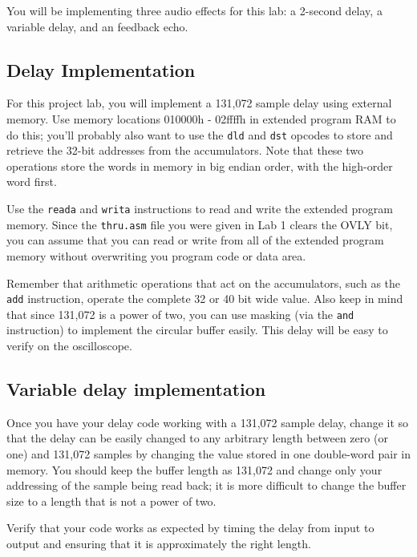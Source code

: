 
%
%
%
%
%

You will be implementing three audio effects for this lab: a 2-second delay,
a variable delay, and an feedback echo.

\subsection{Delay Implementation}

For this project lab, you will implement a 131,072 sample
delay using external memory. Use memory locations 010000h - 02ffffh in
extended program RAM to do this; you'll probably also want to use the
\verb+dld+ and \verb+dst+ opcodes to store and retrieve the 32-bit
addresses from the accumulators. Note that these two operations store
the words in memory in big endian order, with the high-order word first.

Use the \verb+reada+ and \verb+writa+
instructions to read and write the extended program memory.
Since the \verb+thru.asm+ file you were given in Lab 1 clears the
OVLY bit, you can assume that you can read or write from all of the
extended program memory without overwriting you program code or
data area.

Remember that arithmetic operations that act on the accumulators, such
as the \verb+add+ instruction, operate the complete 32 or 40 bit wide
value. Also keep in mind that since 131,072 is a power of two, you can
use masking (via the \verb+and+ instruction) to implement the circular
buffer easily.  This delay will be easy to verify on the oscilloscope.

\subsection{Variable delay implementation}

Once you have your delay code working with a 131,072 sample delay,
change it so that the delay can be easily changed to any arbitrary
length between zero (or one) and 131,072 samples by changing the value
stored in one double-word pair in memory. You should keep the buffer
length as 131,072 and change only your addressing of the sample being
read back; it is more difficult to change the buffer size to a length
that is not a power of two.

Verify that your code works as expected by timing the delay from
input to output and ensuring that it is approximately the
right length.

